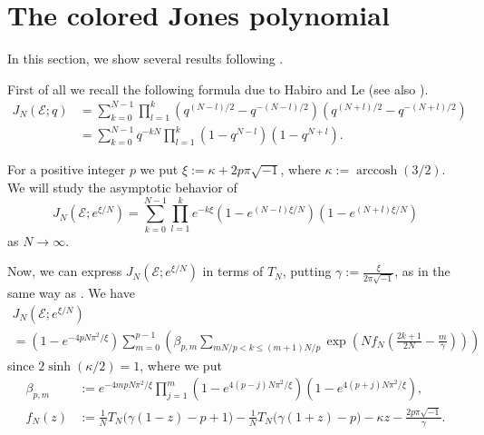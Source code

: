 \documentclass[a4paper,dvipdfmx]{amsart}
\theoremstyle{plain}
\theoremstyle{definition}
\theoremstyle{remark}
\newcommand{\arccosh}{\operatorname{arccosh}}
\newcommand{\FE}{\mathscr{E}}
\renewcommand{\i}{\sqrt{-1}}
\numberwithin{equation}{section}
\begin{document}
\section{The colored Jones polynomial}\label{sec:sum}
In this section, we show several results following \cite{Murakami:CANJM2023}.
\par
First of all we recall the following formula due to Habiro \cite[P.~36 (1)]{Habiro:SURIK2000} and Le  \cite[1.2.2 Example, P.~129]{Le:TOPOA2003} (see also \cite[Theorem~5.1]{Masbaum:ALGGT12003}).
\begin{equation}\label{eq:Habiro_Le}
\begin{split}
  J_N(\FE;q)
  &=
  \sum_{k=0}^{N-1}
  \prod_{l=1}^{k}
  \left(q^{(N-l)/2}-q^{-(N-l)/2}\right)
  \left(q^{(N+l)/2}-q^{-(N+l)/2}\right)
  \\
  &=
  \sum_{k=0}^{N-1}
  q^{-kN}
  \prod_{l=1}^{k}
  \left(1-q^{N-l}\right)
  \left(1-q^{N+l}\right).
\end{split}
\end{equation}
\par
For a positive integer $p$ we put $\xi:=\kappa+2p\pi\i$, where $\kappa:=\arccosh(3/2)$.
We will study the asymptotic behavior of
\begin{equation*}
  J_N\left(\FE;e^{\xi/N}\right)
  =
  \sum_{k=0}^{N-1}
  \prod_{l=1}^{k}
  e^{-k\xi}
  \left(1-e^{(N-l)\xi/N}\right)\left(1-e^{(N+l)\xi/N}\right)
\end{equation*}
as $N\to\infty$.
\par
Now, we can express $J_N(\FE;e^{\xi/N})$ in terms of $T_N$, putting $\gamma:=\frac{\xi}{2\pi\i}$, as in the same way as \cite[Section~3 (3.2)]{Murakami:CANJM2023}.
We have
\begin{multline}\label{eq:J_FN}
  J_N(\FE;e^{\xi/N})
  \\
  =
  \left(1-e^{-4pN\pi^2/\xi}\right)
  \sum_{m=0}^{p-1}
  \left(
    \beta_{p,m}
    \sum_{mN/p<k\le(m+1)N/p}
    \exp\left(Nf_N\left(\frac{2k+1}{2N}-\frac{m}{\gamma}\right)\right)
  \right)
\end{multline}
since $2\sinh(\kappa/2)=1$, where we put
\begin{align}
  \beta_{p,m}
  &:=
  e^{-4mpN\pi^2/\xi}
  \prod_{j=1}^{m}
  \left(1-e^{4(p-j)N\pi^2/\xi}\right)
  \left(1-e^{4(p+j)N\pi^2/\xi}\right),
  \label{eq:beta_pm}
  \\
  f_N(z)
  &:=
  \frac{1}{N}T_N\bigl(\gamma(1-z)-p+1\bigr)
  -
  \frac{1}{N}T_N\bigl(\gamma(1+z)-p\bigr)
  -\kappa z-\frac{2p\pi\i}{\gamma}.
  \label{eq:fN}
\end{align}
\end{document}
